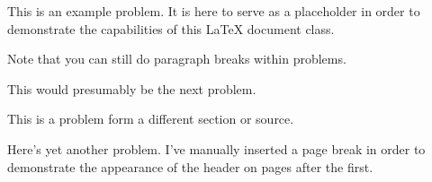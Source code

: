 \documentclass{homework}
\begin{document}
\maketitle


\begin{problem}{3}
This is an example problem. It is here to serve as a
placeholder in order to demonstrate the capabilities of this \LaTeX{}
document class.

Note that you can still do paragraph breaks within problems.
\end{problem}

\begin{problem}{4}
This would presumably be the next problem.
\end{problem}


\begin{problem}{10}
This is a problem form a different section or source.
\end{problem}

\newpage

\begin{problem}{17}
Here's yet another problem. I've manually inserted a page break in
order to demonstrate the appearance of the header on pages after the
first.
\end{problem}
\end{document}

